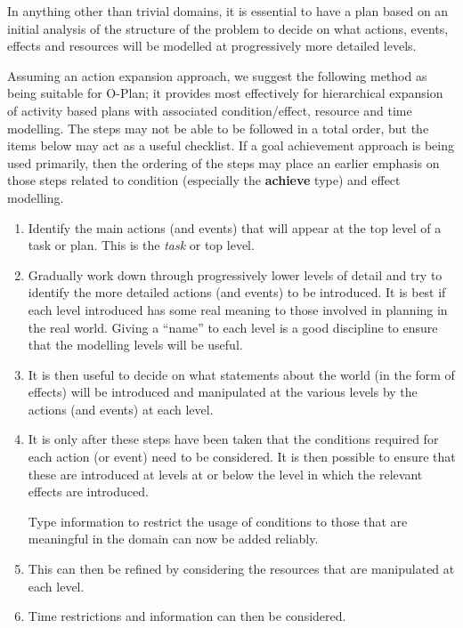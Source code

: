 In anything other than trivial domains, it is essential to have a plan based
on an initial analysis of the structure of the problem to decide on what
actions, events, effects and resources will be modelled at progressively more
detailed levels.

Assuming an action expansion approach, we suggest the following method as
being suitable for O-Plan; it provides most effectively for hierarchical
expansion of activity based plans with associated condition/effect, resource
and time modelling.  The steps may not be able to be followed in a total
order, but the items below may act as a useful checklist.  If a goal
achievement approach is being used primarily, then the ordering of the steps
may place an earlier emphasis on those steps related to condition (especially
the {\bf achieve} type) and effect modelling.

\begin{enumerate}
\item
Identify the main actions (and events) that will appear at the top level of a
task or plan.  This is the {\em task} or top level.

\item
Gradually work down through progressively lower levels of detail and
try to identify the more detailed actions (and events) to be introduced.
It is best if each level introduced has some real meaning to those
involved in planning in the real world.  Giving a ``name'' to each level
is a good discipline to ensure that the modelling levels will be useful.

\item
It is then useful to decide on what statements about the world (in the form of
effects) will be introduced and manipulated at the various levels by the
actions (and events) at each level.

\item
It is only after these steps have been taken that the conditions required
for each action (or event) need to be considered.  It is then possible to
ensure that these are introduced at levels at or below the level in which
the relevant effects are introduced.

Type information to restrict the usage of conditions to those that are
meaningful in the domain can now be added reliably.

\item
This can then be refined by considering the resources that are manipulated at
each level.

\item
Time restrictions and information can then be considered.

\end{enumerate}

